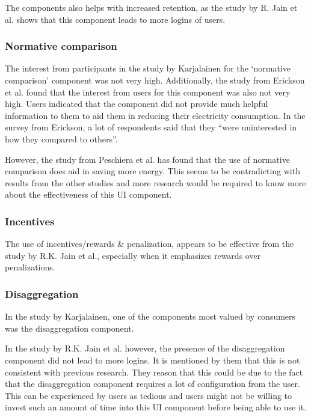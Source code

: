 \documentclass[journal]{vgtc}                %
\begin{document}
The components also helps with increased retention, as the study by R. Jain et al. shows that this component leads to more logins of users.
\subsubsection{Normative comparison}
The interest from participants in the study by Karjalainen for the `normative comparison' component was not very high. 
Additionally, the study from Erickson et al. found that the interest from users for this component was also not very high. Users indicated that the component did not provide much helpful information to them to aid them in reducing their electricity consumption. In the survey from Erickson, a lot of respondents said that they ``were uninterested in how they compared to others''.

However, the study from Peschiera et al. has found that the use of normative comparison does aid in saving more energy. This seems to be contradicting with results from the other studies and more research would be required to know more about the effectiveness of this UI component.
\subsubsection{Incentives}
The use of incentives/rewards \& penalization, appears to be effective from the study by R.K. Jain et al., especially when it emphasizes rewards over penalizations. %

\subsubsection{Disaggregation}
In the study by Karjalainen, one of the components most valued by consumers was the disaggregation component. 

In the study by R.K. Jain et al. however, the presence of the disaggregation component did not lead to more logins. It is mentioned by them that this is not consistent with previous research. 
They reason that this could be due to the fact that the disaggregation component requires a lot of configuration from the user. This can be experienced by users as tedious and users might not be willing to invest such an amount of time into this UI component before being able to use it.

\end{document}
